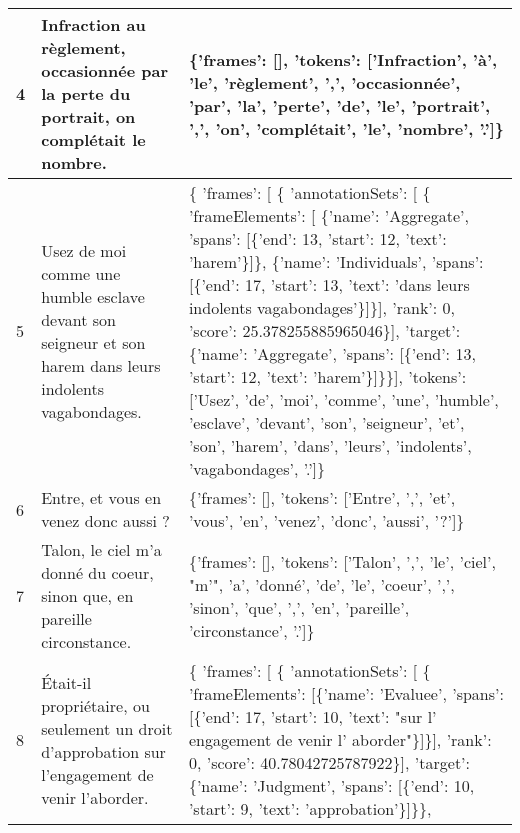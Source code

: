 \documentclass{article}%
\begin{document}
\begin{longtable}{|l |p{5.5cm} |p{9cm}|}
\hline%
4&Infraction au règlement, occasionnée par la perte du portrait, on complétait le nombre.&\{'frames': {[}{]}, 'tokens': {[}'Infraction', 'à', 'le', 'règlement', ',', 'occasionnée', 'par', 'la', 'perte', 'de', 'le', 'portrait', ',', 'on', 'complétait', 'le', 'nombre', '.'{]}\}\\%
\hline%
\rowcolor{lightgray}%
5&Usez de moi comme une humble esclave devant son seigneur et son harem dans leurs indolents vagabondages.&\{ 'frames': {[} \{ 'annotationSets': {[} \{ 'frameElements': {[} \{'name': 'Aggregate', 'spans': {[}\{'end': 13, 'start': 12, 'text': 'harem'\}{]}\},\newline%
                                                         \{'name': 'Individuals', 'spans': {[}\{'end': 17, 'start': 13, 'text': 'dans leurs indolents vagabondages'\}{]}\}{]},\newline%
                                      'rank': 0,\newline%
                                      'score': 25.378255885965046\}{]},\newline%
                'target': \{'name': 'Aggregate', 'spans': {[}\{'end': 13, 'start': 12, 'text': 'harem'\}{]}\}\}{]},\newline%
  'tokens': {[}'Usez', 'de', 'moi', 'comme', 'une', 'humble', 'esclave', 'devant', 'son', 'seigneur', 'et', 'son', 'harem', 'dans', 'leurs', 'indolents', 'vagabondages', '.'{]}\}\\%
\hline%
6&Entre, et vous en venez donc aussi ?&\{'frames': {[}{]}, 'tokens': {[}'Entre', ',', 'et', 'vous', 'en', 'venez', 'donc', 'aussi', '?'{]}\}\\%
\hline%
7&Talon, le ciel m'a donné du coeur, sinon que, en pareille circonstance.&\{'frames': {[}{]}, 'tokens': {[}'Talon', ',', 'le', 'ciel', "m'", 'a', 'donné', 'de', 'le', 'coeur', ',', 'sinon', 'que', ',', 'en', 'pareille', 'circonstance', '.'{]}\}\\%
\hline%
\rowcolor{lightgray}%
8&Était{-}il propriétaire, ou seulement un droit d'approbation sur l'engagement de venir l'aborder.&\{ 'frames': {[} \{ 'annotationSets': {[} \{ 'frameElements': {[}\{'name': 'Evaluee', 'spans': {[}\{'end': 17, 'start': 10, 'text': "sur l' engagement de venir l' aborder"\}{]}\}{]},\newline%
                                      'rank': 0,\newline%
                                      'score': 40.78042725787922\}{]},\newline%
                'target': \{'name': 'Judgment', 'spans': {[}\{'end': 10, 'start': 9, 'text': 'approbation'\}{]}\}\},\newline%

\end{longtable}
\end{document}
